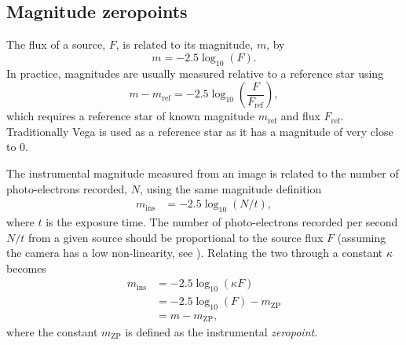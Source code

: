 \subsection{Magnitude zeropoints}
\label{sec:zeropoints}
\begin{colsection}

The flux of a source, $F$, is related to its magnitude, $m$, by
%
\begin{equation}
    m = -2.5 \log_{10}(F).
    \label{eq:apparent_magnitude}
\end{equation}
%
In practice, magnitudes are usually measured relative to a reference star using
%
\begin{equation}
    m - m_\text{ref} = -2.5 \log_{10}\left(\frac{F}{F_\text{ref}}\right),
    \label{eq:magnitude_ref}
\end{equation}
%
which requires a reference star of known magnitude $m_\text{ref}$ and flux $F_\text{ref}$. Traditionally Vega is used as a reference star as it has a magnitude of very close to 0.

The instrumental magnitude measured from an image is related to the number of photo-electrons recorded, $N$, using the same magnitude definition
%
\begin{equation}
    \begin{split}
        m_\text{ins} & = -2.5 \log_{10}(N/t),
    \end{split}
    \label{eq:ins_mag}
\end{equation}
%
where $t$ is the exposure time. The number of photo-electrons recorded per second $N/t$ from a given source should be proportional to the source flux $F$ (assuming the camera has a low non-linearity, see ). Relating the two through a constant $\kappa$  becomes
%
\begin{equation}
    \begin{split}
        m_\text{ins} & = -2.5 \log_{10}\left(\kappa F\right) \\
                     & = -2.5 \log_{10}\left(F\right) - m_\text{ZP}    \\
                     & = m - m_\text{ZP},
    \end{split}
    \label{eq:ins_mag2}
\end{equation}
%
where the constant $m_\text{ZP}$ is defined as the instrumental \emph{zeropoint}.


\end{colsection}

